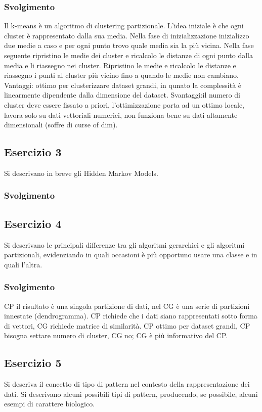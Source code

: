 \documentclass{article}
\begin{document}
\subsubsection*{Svolgimento}
Il k-means è un algoritmo di clustering partizionale. L'idea iniziale è che ogni cluster è rappresentato dalla
sua media. Nella fase di inizializzazione inizializzo due medie a caso e per ogni punto trovo quale media
sia la più vicina. Nella fase seguente ripristino le medie dei cluster e ricalcolo le distanze di ogni punto
dalla media e li riassegno nei cluster. Ripristino le medie e ricalcolo le distanze e riassegno i punti al
cluster più vicino fino a quando le medie non cambiano.
Vantaggi: ottimo per clusterizzare dataset grandi, in qunato la complessità è linearmente dipendente dalla
dimensione del dataset. Svantaggi:il numero di cluster deve essere fissato a priori, l'ottimizzazione porta
ad un ottimo locale, lavora solo su dati vettoriali numerici, non funziona bene su dati altamente
dimensionali (soffre di curse of dim).

\subsection*{Esercizio 3}
Si descrivano in breve gli Hidden Markov Models.
\subsubsection*{Svolgimento}

\subsection*{Esercizio 4}
Si descrivano le principali differenze tra gli algoritmi gerarchici e gli algoritmi partizionali,
evidenziando in quali occasioni è più opportuno usare una classe e in quali l'altra.
\subsubsection*{Svolgimento}
CP il risultato è una singola partizione di dati, nel CG è una serie di partizioni innestate (dendrogramma).
CP richiede che i dati siano rappresentati sotto forma di vettori, CG richiede matrice di similarità. CP
ottimo per dataset grandi, CP bisogna settare numero di cluster, CG no; CG è più informativo del CP.

\subsection*{Esercizio 5}
Si descriva il concetto di tipo di pattern nel contesto della rappresentazione dei dati. Si descrivano
alcuni possibili tipi di pattern, producendo, se possibile, alcuni esempi di carattere biologico.
\end{document}
